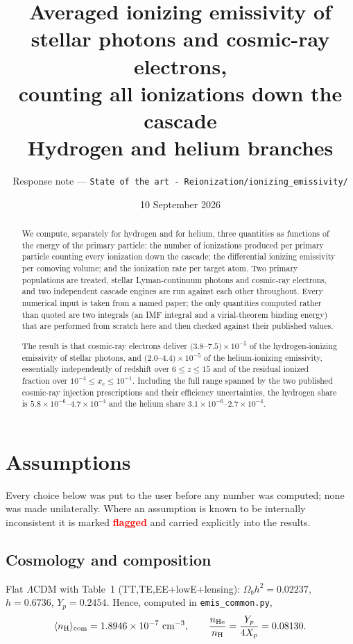 \documentclass[11pt,a4paper]{article}
\title{Averaged ionizing emissivity of stellar photons and cosmic-ray
electrons,\\ counting all ionizations down the cascade\\
\large Hydrogen and helium branches}
\author{Response note --- \texttt{State of the art - Reionization/ionizing\_emissivity/}}
\date{10 September 2026}
\newcommand{\flag}[1]{\textbf{\textcolor{red}{#1}}}
\begin{document}
\maketitle

\begin{abstract}
\noindent
We compute, separately for hydrogen and for helium, three quantities as
functions of the energy of the primary particle: the number of ionizations
produced per primary particle counting every ionization down the cascade; the
differential ionizing emissivity per comoving volume; and the ionization rate
per target atom.  Two primary populations are treated, stellar
Lyman-continuum photons and cosmic-ray electrons, and two independent cascade
engines are run against each other throughout.  Every numerical input is
taken from a named paper; the only quantities computed rather than quoted are
two integrals (an IMF integral and a virial-theorem binding energy) that are
performed from scratch here and then checked against their published values.

The result is that cosmic-ray electrons deliver
$(3.8$--$7.5)\times10^{-5}$ of the hydrogen-ionizing emissivity of stellar
photons, and $(2.0$--$4.4)\times10^{-5}$ of the helium-ionizing emissivity,
essentially independently of redshift over $6\le z\le15$ and of the residual
ionized fraction over $10^{-4}\le x_e\le10^{-1}$.  Including the full range
spanned by the two published cosmic-ray injection prescriptions and their
efficiency uncertainties, the hydrogen share is
$5.8\times10^{-6}$--$4.7\times10^{-4}$ and the helium share
$3.1\times10^{-6}$--$2.7\times10^{-4}$.
\end{abstract}

\tableofcontents

\section{Assumptions}

Every choice below was put to the user before any number was computed; none
was made unilaterally.  Where an assumption is known to be internally
inconsistent it is marked \flag{flagged} and carried explicitly into the
results.

\subsection{Cosmology and composition}
Flat $\Lambda$CDM with \citet{Planck2018} Table~1
(TT,TE,EE+lowE+lensing): $\Omega_b h^2 = 0.02237$, $h = 0.6736$,
$Y_p = 0.2454$.  Hence, computed in \texttt{emis\_common.py},
\begin{equation}
  \langle n_{\rm H}\rangle_{\rm com} = 1.8946\times10^{-7}\ {\rm cm^{-3}},
  \qquad
  \frac{n_{\rm He}}{n_{\rm H}} = \frac{Y_p}{4X_p} = 0.08130 .
\end{equation}
\end{document}
